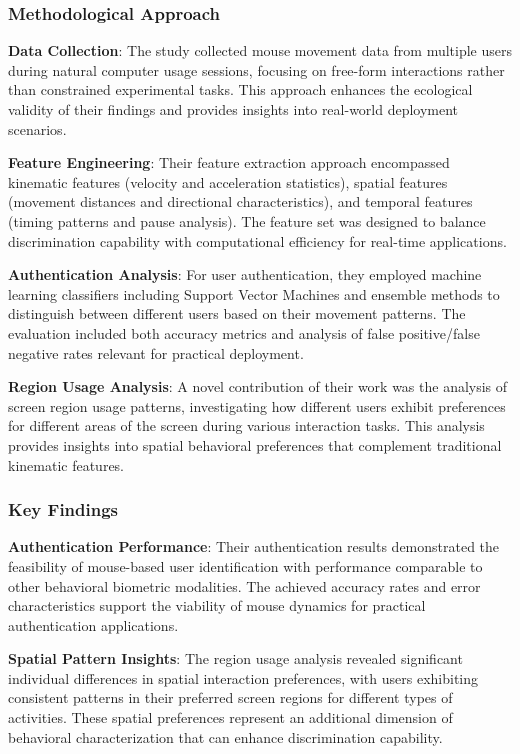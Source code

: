 \documentclass[
  12pt,
  a4paper,
]{report}
\begin{document}
\subsubsection{Methodological Approach}\label{methodological-approach-1}

\textbf{Data Collection}: The study collected mouse movement data from
multiple users during natural computer usage sessions, focusing on
free-form interactions rather than constrained experimental tasks. This
approach enhances the ecological validity of their findings and provides
insights into real-world deployment scenarios.

\textbf{Feature Engineering}: Their feature extraction approach
encompassed kinematic features (velocity and acceleration statistics),
spatial features (movement distances and directional characteristics),
and temporal features (timing patterns and pause analysis). The feature
set was designed to balance discrimination capability with computational
efficiency for real-time applications.

\textbf{Authentication Analysis}: For user authentication, they employed
machine learning classifiers including Support Vector Machines and
ensemble methods to distinguish between different users based on their
movement patterns. The evaluation included both accuracy metrics and
analysis of false positive/false negative rates relevant for practical
deployment.

\textbf{Region Usage Analysis}: A novel contribution of their work was
the analysis of screen region usage patterns, investigating how
different users exhibit preferences for different areas of the screen
during various interaction tasks. This analysis provides insights into
spatial behavioral preferences that complement traditional kinematic
features.

\subsubsection{Key Findings}\label{key-findings}

\textbf{Authentication Performance}: Their authentication results
demonstrated the feasibility of mouse-based user identification with
performance comparable to other behavioral biometric modalities. The
achieved accuracy rates and error characteristics support the viability
of mouse dynamics for practical authentication applications.

\textbf{Spatial Pattern Insights}: The region usage analysis revealed
significant individual differences in spatial interaction preferences,
with users exhibiting consistent patterns in their preferred screen
regions for different types of activities. These spatial preferences
represent an additional dimension of behavioral characterization that
can enhance discrimination capability.
\end{document}
